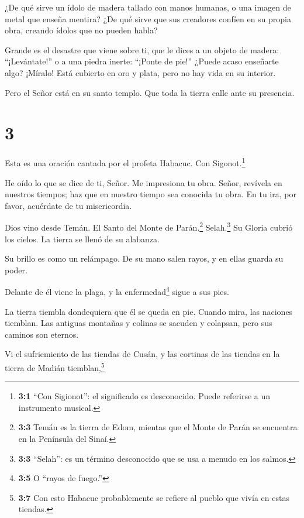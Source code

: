  ¿De qué sirve un ídolo de madera tallado con manos
humanas, o una imagen de metal que enseña mentira? ¿De qué sirve que sus
creadores confíen en su propia obra, creando ídolos que no pueden habla?

 Grande es el desastre que viene sobre ti, que le dices a
un objeto de madera: ``¡Levántate!'' o a una piedra inerte: ``¡Ponte de
pie!'' ¿Puede acaso enseñarte algo? ¡Míralo! Está cubierto en oro y
plata, pero no hay vida en su interior.

 Pero el Señor está en su santo templo. Que toda la tierra
calle ante su presencia.

\hypertarget{section-2}{%
\section{3}\label{section-2}}

 Esta es una oración cantada por el profeta Habacuc. Con
Sigonot.\footnote{\textbf{3:1} ``Con Sigionot'': el significado es
  desconocido. Puede referirse a un instrumento musical.}

 He oído lo que se dice de ti, Señor. Me impresiona tu obra.
Señor, revívela en nuestros tiempos; haz que en nuestro tiempo sea
conocida tu obra. En tu ira, por favor, acuérdate de tu misericordia.

 Dios vino desde Temán. El Santo del Monte de
Parán.\footnote{\textbf{3:3} Temán es la tierra de Edom, mientas que el
  Monte de Parán se encuentra en la Península del Sinaí.}
Selah.\footnote{\textbf{3:3} ``Selah'': es un término desconocido que se
  usa a menudo en los salmos.} Su Gloria cubrió los cielos. La tierra se
llenó de su alabanza.

 Su brillo es como un relámpago. De su mano salen rayos, y
en ellas guarda su poder.

 Delante de él viene la plaga, y la enfermedad\footnote{\textbf{3:5}
  O ``rayos de fuego.''} sigue a sus pies.

 La tierra tiembla dondequiera que él se queda en pie.
Cuando mira, las naciones tiemblan. Las antiguas montañas y colinas se
sacuden y colapsan, pero sus caminos son eternos.

 Vi el sufriemiento de las tiendas de Cusán, y las cortinas
de las tiendas en la tierra de Madián tiemblan,\footnote{\textbf{3:7}
  Con esto Habacuc probablemente se refiere al pueblo que vivía en estas
  tiendas.}

